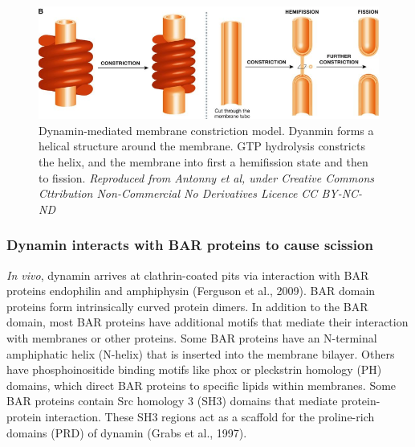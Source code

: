 		
	\begin{figure}[H]
			\centering
			\includegraphics[scale=0.5]{figures/intro/dynamin_2}
\caption[Dynamin forms a scaffold]
					{Dynamin-mediated membrane constriction model. Dyanmin forms a helical structure around the membrane. GTP hydrolysis constricts the helix, and the membrane into first a hemifission state and then to fission.
					\textit{Reproduced from Antonny et al, under Creative Commons Cttribution Non-Commercial No Derivatives Licence CC BY-NC-ND}
		\label{intro_dynamin_scission}}
		\end{figure}



		\subsubsection{Dynamin interacts with BAR proteins to cause scission}
\textit{In vivo}, dynamin arrives at clathrin-coated pits via interaction with BAR proteins endophilin and amphiphysin (Ferguson et al., 2009). BAR domain proteins form intrinsically curved protein dimers. In addition to the BAR domain, most BAR proteins have additional motifs that mediate their interaction with membranes or other proteins. Some BAR proteins have an N-terminal amphiphatic helix (N-helix) that is inserted into the membrane bilayer.  Others have phosphoinositide binding motifs like phox or pleckstrin homology (PH) domains, which direct BAR proteins to specific lipids within membranes. Some BAR proteins contain Src homology 3 (SH3) domains that mediate protein-protein interaction. These SH3 regions act as a scaffold for the proline-rich domains (PRD) of dynamin (Grabs et al., 1997). 



